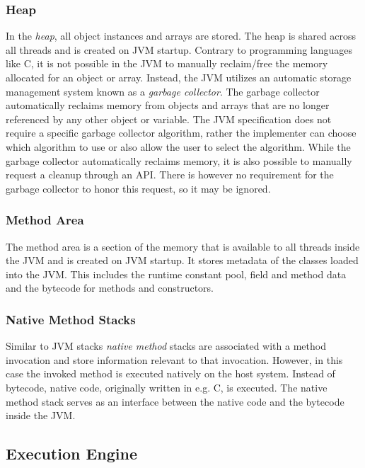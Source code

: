 \subsubsection{Heap}

In the \textit{heap}, all object instances and arrays are stored. The heap is shared across all threads and is created on JVM startup. Contrary to programming languages like C, it is not possible in the JVM to manually reclaim/free the memory allocated for an object or array. Instead, the JVM utilizes an automatic storage management system known as a \textit{garbage collector}. The garbage collector automatically reclaims memory from objects and arrays that are no longer referenced by any other object or variable. The JVM specification does not require a specific garbage collector algorithm, rather the implementer can choose which algorithm to use or also allow the user to select the algorithm. While the garbage collector automatically reclaims memory, it is also possible to manually request a cleanup through an API. There is however no requirement for the garbage collector to honor this request, so it may be ignored. 

\subsubsection{Method Area}

The method area is a section of the memory that is available to all threads inside the JVM and is created on JVM startup. It stores metadata of the classes loaded into the JVM. This includes the runtime constant pool, field and method data and the bytecode for methods and constructors.

\subsubsection{Native Method Stacks}

Similar to JVM stacks \textit{native method} stacks are associated with a method invocation and store information relevant to that invocation. However, in this case the invoked method is executed natively on the host system. Instead of bytecode, native code, originally written in e.g. C, is executed. The native method stack serves as an interface between the native code and the bytecode inside the JVM.  
  
\subsection{Execution Engine}


